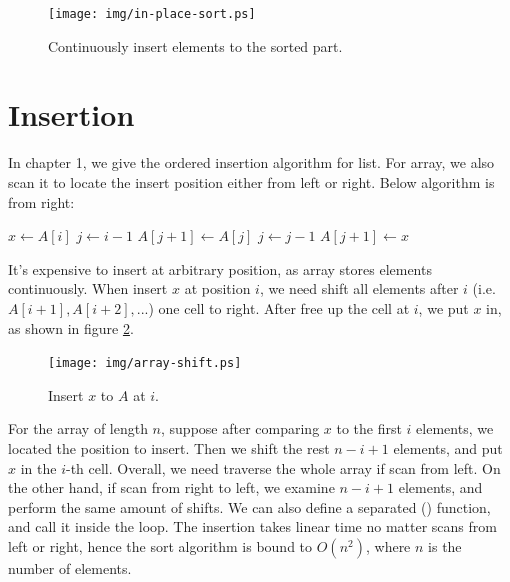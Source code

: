 \documentclass[b5paper]{article}
\begin{document}
\begin{figure}[htbp]
  \centering
  \texttt{[image: img/in-place-sort.ps]}
  \caption{Continuously insert elements to the sorted part.}
  \label{fig:in-place-sort}
\end{figure}

\section{Insertion}

In chapter 1, we give the ordered insertion algorithm for list. For array, we also scan it to locate the insert position either from left or right. Below algorithm is from right:

\begin{algorithmic}[1]
    \State $x \gets A[i]$ 
    \State $j \gets i-1$
      \State $A[j+1] \gets A[j]$
      \State $j \gets j - 1$
    \EndWhile
    \State $A[j+1] \gets x$
  \EndFor
\EndFunction
\end{algorithmic}

It's expensive to insert at arbitrary position, as array stores elements continuously. When insert $x$ at position $i$, we need shift all elements after $i$ (i.e. $A[i + 1], A[i + 2], ...$) one cell to right. After free up the cell at $i$, we put $x$ in, as shown in figure \ref{fig:array-shift}.

\begin{figure}[htbp]
  \centering
  \texttt{[image: img/array-shift.ps]}
  \caption{Insert $x$ to $A$ at $i$.}
  \label{fig:array-shift}
\end{figure}

For the array of length $n$, suppose after comparing $x$ to the first $i$ elements, we located the position to insert. Then we shift the rest $n - i + 1$ elements, and put $x$ in the $i$-th cell. Overall, we need traverse the whole array if scan from left. On the other hand, if scan from right to left, we examine $n - i + 1$ elements, and perform the same amount of shifts. We can also define a separated () function, and call it inside the loop. The insertion takes linear time no matter scans from left or right, hence the sort algorithm is bound to $O(n^2)$, where $n$ is the number of elements.

\begin{Exercise}
\end{Exercise}
\end{document}
